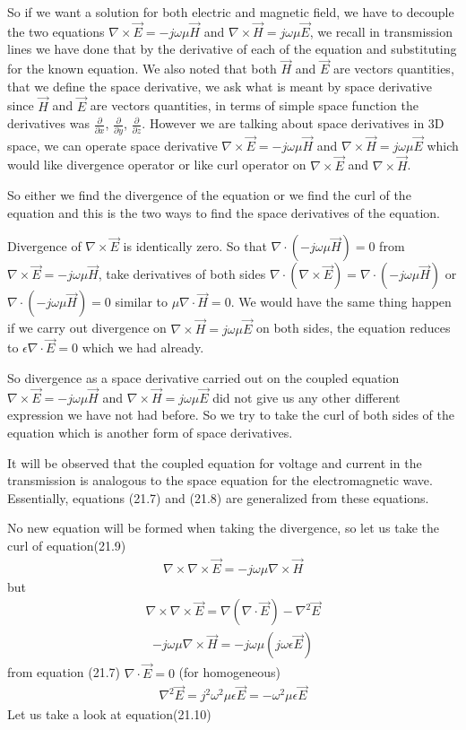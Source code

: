 So if we want a solution for both electric and magnetic field, we have to decouple the two equations $\nabla\times\vec{E}=-j\omega\mu\vec{H}$ and $\nabla\times\vec{H}=j\omega\mu\vec{E}$, we recall in transmission lines we have done that by the derivative of each of the equation and substituting for the known equation. We also noted that both $\vec{H}$ and $\vec{E}$ are vectors quantities, that we define the space derivative, we ask what is meant by space derivative since $\vec{H}$ and $\vec{E}$ are vectors quantities, in terms of simple space function the derivatives was $\frac{\partial}{\partial x}$, $\frac{\partial}{\partial y}$, $\frac{\partial}{\partial z}$. However we are talking about space derivatives in 3D space, we can operate space derivative $\nabla\times\vec{E}=-j\omega\mu\vec{H}$ and $\nabla\times\vec{H}=j\omega\mu\vec{E}$ which would like divergence operator or like curl operator on $\nabla\times\vec{E}$ and $\nabla\times\vec{H}$. 

So either we find the divergence of the equation or we find the curl of the equation and this is the two ways to find the space derivatives of the equation.

Divergence of $\nabla\times\vec{E}$ is identically zero. So that $\nabla\cdot(-j\omega\mu\vec{H})=0$ from $\nabla\times\vec{E}=-j\omega\mu\vec{H}$, take derivatives of both sides $\nabla\cdot(\nabla\times\vec{E})=\nabla\cdot(-j\omega\mu\vec{H})$ or $\nabla\cdot(-j\omega\mu\vec{H})=0$ similar to $\mu\nabla\cdot\vec{H}=0$. We would have the same thing happen if we carry out divergence on $\nabla\times\vec{H}=j\omega\mu\vec{E}$ on both sides, the equation reduces to $\epsilon\nabla\cdot\vec{E}=0$ which we had already.

So divergence as a space derivative carried out on the coupled equation $\nabla\times\vec{E}=-j\omega\mu\vec{H}$ and $\nabla\times\vec{H}=j\omega\mu\vec{E}$ did not give us any other different expression we have not had before. So we try to take the curl of both sides of the equation which is another form of space derivatives.

It will be observed that the coupled equation for voltage and current in the transmission is analogous to the space equation for the electromagnetic wave. Essentially, equations (21.7) and (21.8) are generalized from these equations.

No new equation will be formed when taking the divergence, so let us take the curl of equation(21.9)
\begin{align}
\nabla\times\nabla\times\vec{E}=-j\omega\mu\nabla\times\vec{H}
\end{align}
but 
\begin{align}
\nabla\times\nabla\times\vec{E}=\nabla(\nabla\cdot\vec{E}) - \nabla^2\vec{E}
\end{align}
\begin{align}
-j\omega\mu\nabla\times \vec{H}=-j\omega\mu(j\omega\epsilon\vec{E})
\end{align}
from equation (21.7) $\nabla\cdot\vec{E}=0$ (for homogeneous)
\begin{align}
\nabla^2\vec{E}=j^2\omega^2\mu\epsilon\vec{E}=-\omega^2\mu\epsilon\vec{E}
\end{align}
Let us take a look at equation(21.10)

